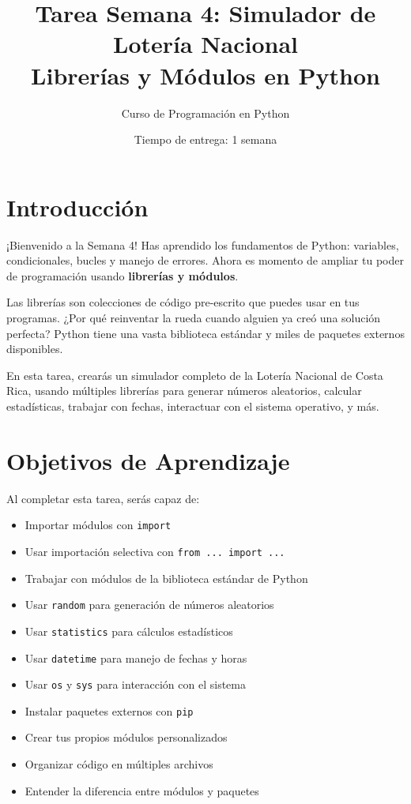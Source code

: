 \documentclass[12pt,a4paper]{article}
\title{\textbf{Tarea Semana 4: Simulador de Lotería Nacional}\\
\large Librerías y Módulos en Python}
\author{Curso de Programación en Python}
\date{Tiempo de entrega: 1 semana}
\begin{document}
\maketitle

\section{Introducción}

¡Bienvenido a la Semana 4! Has aprendido los fundamentos de Python: variables, condicionales, bucles y manejo de errores. Ahora es momento de ampliar tu poder de programación usando \textbf{librerías y módulos}.

Las librerías son colecciones de código pre-escrito que puedes usar en tus programas. ¿Por qué reinventar la rueda cuando alguien ya creó una solución perfecta? Python tiene una vasta biblioteca estándar y miles de paquetes externos disponibles.

En esta tarea, crearás un simulador completo de la Lotería Nacional de Costa Rica, usando múltiples librerías para generar números aleatorios, calcular estadísticas, trabajar con fechas, interactuar con el sistema operativo, y más.

\section{Objetivos de Aprendizaje}

Al completar esta tarea, serás capaz de:

\begin{itemize}[leftmargin=*]
    \item Importar módulos con \texttt{import}
    \item Usar importación selectiva con \texttt{from ... import ...}
    \item Trabajar con módulos de la biblioteca estándar de Python
    \item Usar \texttt{random} para generación de números aleatorios
    \item Usar \texttt{statistics} para cálculos estadísticos
    \item Usar \texttt{datetime} para manejo de fechas y horas
    \item Usar \texttt{os} y \texttt{sys} para interacción con el sistema
    \item Instalar paquetes externos con \texttt{pip}
    \item Crear tus propios módulos personalizados
    \item Organizar código en múltiples archivos
    \item Entender la diferencia entre módulos y paquetes
\end{itemize}
\end{document}
